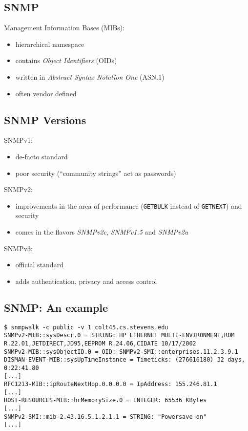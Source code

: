 \documentclass[xga]{xdvislides}
\begin{document}
\subsection{SNMP}
Management Information Bases (MIBs):
\begin{itemize}
	\item hierarchical namespace
	\item contains {\em Object Identifiers} (OIDs)
	\item written in {\em Abstract Syntax Notation One} (ASN.1)
	\item often vendor defined
\end{itemize}

\subsection{SNMP Versions}
SNMPv1:
\begin{itemize}
	\item de-facto standard
	\item poor security (``community strings'' act as passwords)
\end{itemize}
\vspace{.2in}
SNMPv2:
\begin{itemize}
	\item improvements in the area of performance (\verb+GETBULK+ instead of \verb+GETNEXT+) and security
	\item comes in the flavors {\em SNMPv2c}, {\em SNMPv1.5} and {\em SNMPv2u}
\end{itemize}
\vspace{.2in}
SNMPv3:
\begin{itemize}
	\item official standard
	\item adds authentication, privacy and access control
\end{itemize}

\subsection{SNMP: An example}
\smallish
\begin{verbatim}
$ snmpwalk -c public -v 1 colt45.cs.stevens.edu
SNMPv2-MIB::sysDescr.0 = STRING: HP ETHERNET MULTI-ENVIRONMENT,ROM
R.22.01,JETDIRECT,JD95,EEPROM R.24.06,CIDATE 10/17/2002
SNMPv2-MIB::sysObjectID.0 = OID: SNMPv2-SMI::enterprises.11.2.3.9.1
DISMAN-EVENT-MIB::sysUpTimeInstance = Timeticks: (276616180) 32 days, 0:22:41.80
[...]
RFC1213-MIB::ipRouteNextHop.0.0.0.0 = IpAddress: 155.246.81.1
[...]
HOST-RESOURCES-MIB::hrMemorySize.0 = INTEGER: 65536 KBytes
[...]
SNMPv2-SMI::mib-2.43.16.5.1.2.1.1 = STRING: "Powersave on"
[...]
\end{verbatim}
\end{document}
